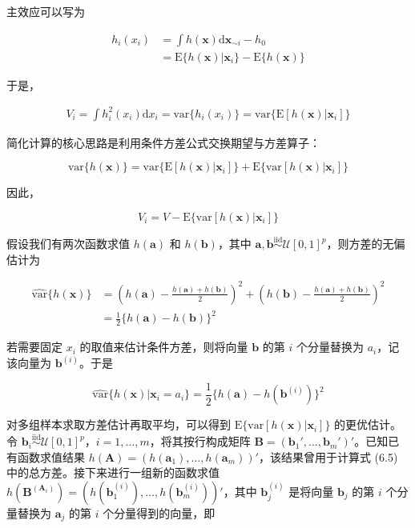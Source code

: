 \documentclass{ctexart}
\begin{document}
主效应可以写为

\begin{align*}
h_i(x_i)&=\int h(\boldsymbol{x})\mathrm{d}\boldsymbol{x}_{\sim i}-h_0\\
&=\mathrm{E}\{h(\boldsymbol{x})|\boldsymbol{x}_i\}-\mathrm{E}\{h(\boldsymbol{x})\}
\end{align*}

于是，

\begin{align*}
V_i=\int h_i^2(x_i)\mathrm{d}x_i
=\mathrm{var}\{h_i(x_i)\}
=\mathrm{var}\{\mathrm{E}[h(\boldsymbol{x})|\boldsymbol{x}_i]\}
\end{align*}

简化计算的核心思路是利用条件方差公式交换期望与方差算子：

\begin{equation*}
\mathrm{var}\{h(\boldsymbol{x})\}=\mathrm{var}\{\mathrm{E}[h(\boldsymbol{x})|\boldsymbol{x}_i]\}+\mathrm{E}\{\mathrm{var}[h(\boldsymbol{x})|\boldsymbol{x}_i]\}
\end{equation*}

因此，

\begin{equation*}
V_i=V-\mathrm{E}\{\mathrm{var}[h(\boldsymbol{x})|\boldsymbol{x}_i]\}
\end{equation*}

假设我们有两次函数求值 $h(\boldsymbol{a})$ 和 $h(\boldsymbol{b})$，其中 $\boldsymbol{a},\boldsymbol{b}\stackrel{\text{iid}}{\sim}\mathcal{U}[0,1]^p$，则方差的无偏估计为

\begin{align*}
\widehat{\mathrm{var}}\{h(\boldsymbol{x})\}&=\left(h(\boldsymbol{a})-\frac{h(\boldsymbol{a})+h(\boldsymbol{b})}{2}\right)^2+\left(h(\boldsymbol{b})-\frac{h(\boldsymbol{a})+h(\boldsymbol{b})}{2}\right)^2\\
&=\frac12\{h(\boldsymbol{a})-h(\boldsymbol{b})\}^2
\end{align*}

若需要固定 $x_i$ 的取值来估计条件方差，则将向量 $\boldsymbol{b}$ 的第 $i$ 个分量替换为 $a_i$，记该向量为 $\boldsymbol{b}^{(i)}$。于是

\begin{equation*}
\widehat{\mathrm{var}}\{h(\boldsymbol{x})|\boldsymbol{x}_i=a_i\}=\frac12\{h(\boldsymbol{a})-h(\boldsymbol{b}^{(i)})\}^2
\end{equation*}

对多组样本求取方差估计再取平均，可以得到 $\mathrm{E}\{\mathrm{var}[h(\boldsymbol{x})|\boldsymbol{x}_i]\}$ 的更优估计。令 $\boldsymbol b_i\stackrel{\text{iid}}{\sim}\mathcal{U}[0,1]^p$，$i=1,\dots,m$，将其按行构成矩阵 $\boldsymbol B=(\boldsymbol b_1',\dots,\boldsymbol b_m')'$。已知已有函数求值结果 $h(\boldsymbol A)=(h(\boldsymbol{a}_1),\dots,h(\boldsymbol{a}_m))'$，该结果曾用于计算式 (6.5) 中的总方差。接下来进行一组新的函数求值 $h(\boldsymbol B^{(\boldsymbol{A}_i)})=\left(h(\boldsymbol{b}_1^{(i)}),\dots,h(\boldsymbol{b}_m^{(i)})\right)'$，其中 $\boldsymbol b_j^{(i)}$ 是将向量 $\boldsymbol b_j$ 的第 $i$ 个分量替换为 $\boldsymbol a_j$ 的第 $i$ 个分量得到的向量，即
\end{document}
